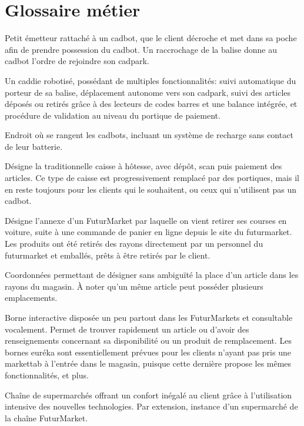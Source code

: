 \chapter{Glossaire métier}

Petit émetteur rattaché à un cadbot, que le client décroche et met dans sa poche afin de prendre possession du cadbot.
Un raccrochage de la balise donne au cadbot l'ordre de rejoindre son cadpark.

Un caddie robotisé, possédant de multiples fonctionnalités: suivi automatique du porteur de sa balise, déplacement autonome vers son cadpark, suivi des articles déposés ou retirés grâce à des lecteurs de codes barres et une balance intégrée, et procédure de validation au niveau du portique de paiement.

Endroit où se rangent les cadbots, incluant un système de recharge sans contact de leur batterie.

Désigne la traditionnelle caisse à hôtesse, avec dépôt, scan puis paiement des articles.
Ce type de caisse est progressivement remplacé par des portiques, mais il en reste toujours pour les clients qui le souhaitent, ou ceux qui n'utilisent pas un cadbot.

Désigne l'annexe d'un FuturMarket par laquelle on vient retirer ses courses en voiture, suite à une commande de panier en ligne depuis le site du futurmarket.
Les produits ont été retirés des rayons directement par un personnel du futurmarket et emballés, prêts à être retirés par le client.

Coordonnées permettant de désigner sans ambiguïté la place d'un article dans les rayons du magasin.
À noter qu'un même article peut posséder plusieurs emplacements.

Borne interactive disposée un peu partout dans les FuturMarkets et consultable vocalement.
Permet de trouver rapidement un article ou d'avoir des renseignements concernant sa disponibilité ou un produit de remplacement.
Les bornes euréka sont essentiellement prévues pour les clients n'ayant pas pris une markettab à l'entrée dans le magasin, puisque cette dernière propose les mêmes fonctionnalités, et plus.

Chaîne de supermarchés offrant un confort inégalé au client grâce à l'utilisation intensive des nouvelles technologies.
Par extension, instance d'un supermarché de la chaîne FuturMarket.

